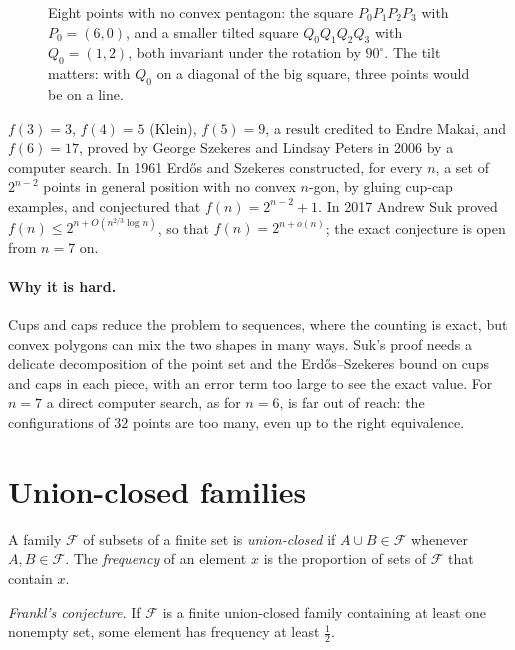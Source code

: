 \begin{figure}[ht]
\centering
{}
\caption{Eight points with no convex pentagon: the square $P_0P_1P_2P_3$ with $P_0=(6,0)$, and a smaller tilted square $Q_0Q_1Q_2Q_3$ with
$Q_0=(1,2)$, both invariant under the rotation by $90^\circ$. The tilt matters: with $Q_0$ on a diagonal of the big square, three points would be on a
line.}
\label{conjectures:fig:eight}
\end{figure}

\begin{remark}\label{conjectures:rem:esz}
$f(3)=3$, $f(4)=5$ (Klein), $f(5)=9$, a result credited to Endre Makai, and $f(6)=17$, proved by George Szekeres and Lindsay Peters in 2006 by a computer
search. In 1961 Erd\H os and Szekeres constructed, for every $n$, a set of $2^{n-2}$ points in general position with no convex $n$-gon, by gluing
cup-cap examples, and conjectured that $f(n)=2^{n-2}+1$. In 2017 Andrew Suk proved $f(n)\le2^{n+O(n^{2/3}\log n)}$, so that $f(n)=2^{n+o(n)}$; the
exact conjecture is open from $n=7$ on.
\end{remark}

\paragraph{Why it is hard.} Cups and caps reduce the problem to sequences, where the counting is exact, but convex polygons can mix the two shapes in
many ways. Suk's proof needs a delicate decomposition of the point set and the Erd\H os--Szekeres bound on cups and caps in each piece, with an error
term too large to see the exact value. For $n=7$ a direct computer search, as for $n=6$, is far out of reach: the configurations of $32$ points are too
many, even up to the right equivalence.

\section{Union-closed families}

A family $\mathcal F$ of subsets of a finite set is \emph{union-closed} if $A\cup B\in\mathcal F$ whenever $A,B\in\mathcal F$. The \emph{frequency} of an
element $x$ is the proportion of sets of $\mathcal F$ that contain $x$.

\begin{center}
\emph{Frankl's conjecture.} If $\mathcal F$ is a finite union-closed family containing at least one nonempty set, some element has frequency at least
$\frac12$.
\end{center}

